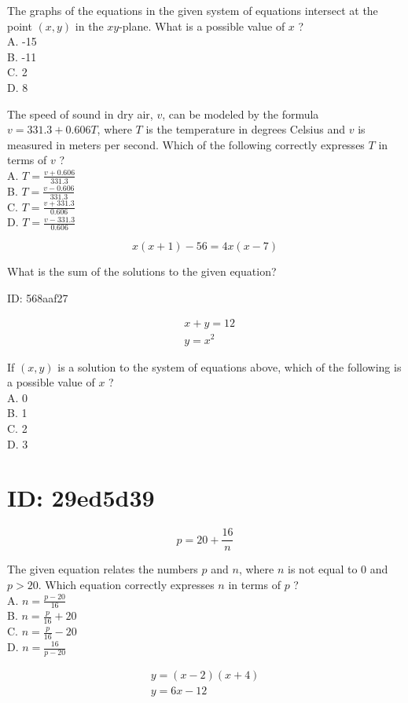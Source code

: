 The graphs of the equations in the given system of equations intersect at the point $(x, y)$ in the $x y$-plane. What is a possible value of $x$ ?\\
A. -15\\
B. -11\\
C. 2\\
D. 8

The speed of sound in dry air, $v$, can be modeled by the formula $v=331.3+0.606 T$, where $T$ is the temperature in degrees Celsius and $v$ is measured in meters per second. Which of the following correctly expresses $T$ in terms of $v$ ?\\
A. $T=\frac{v+0.606}{331.3}$\\
B. $T=\frac{v-0.606}{331.3}$\\
C. $T=\frac{v+331.3}{0.606}$\\
D. $T=\frac{v-331.3}{0.606}$

$$
x(x+1)-56=4 x(x-7)
$$

What is the sum of the solutions to the given equation?

ID: 568aaf27

$$
\begin{aligned}
& x+y=12 \\
& y=x^{2}
\end{aligned}
$$

If $(x, y)$ is a solution to the system of equations above, which of the following is a possible value of $x$ ?\\
A. 0\\
B. 1\\
C. 2\\
D. 3

\section*{ID: 29ed5d39}
$$
p=20+\frac{16}{n}
$$

The given equation relates the numbers $p$ and $n$, where $n$ is not equal to 0 and $p>20$. Which equation correctly expresses $n$ in terms of $p$ ?\\
A. $n=\frac{p-20}{16}$\\
B. $n=\frac{p}{16}+20$\\
C. $n=\frac{p}{16}-20$\\
D. $n=\frac{16}{p-20}$

$$
\begin{gathered}
y=(x-2)(x+4) \\
y=6 x-12
\end{gathered}
$$

